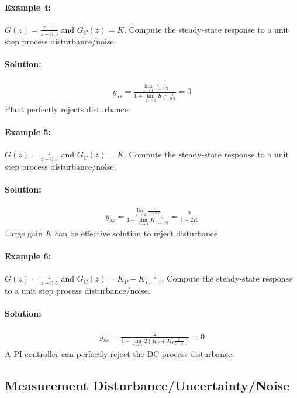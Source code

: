 \documentclass[twoside]{article}
\begin{document}
\paragraph{Example 4:} $G(z) = \frac{z-1}{z-0.5}$ and $G_C(z) =
K$. Compute the steady-state response to a unit step
process disturbance/noise.

\paragraph{Solution:} 
%
\begin{align*}
y_{ss} = \frac{\lim_{z\to1}  \frac{z-1}{z-0.5}}{1 + \lim_{z\to1} K
  \frac{z-1}{z-0.5}} = 0
\end{align*}
%
Plant perfectly rejects disturbance. 
%

\paragraph{Example 5:} $G(z) = \frac{z}{z-0.5}$ and $G_C(z) =
K$. Compute the steady-state response to a unit step
process disturbance/noise.

\paragraph{Solution:} 
%
\begin{align*}
y_{ss} = \frac{\lim_{z\to1}  \frac{z}{z-0.5}}{1 + \lim_{z\to1} K
  \frac{z}{z-0.5}} = \frac{2}{1 + 2 K} 
\end{align*}
%
Large gain $K$ can be effective solution to reject disturbance
%

\paragraph{Example 6:} $G(z) = \frac{z}{z-0.5}$ and $G_C(z) = K_P +
K_I \frac{z}{z-1}$. Compute the steady-state response to a unit step
process disturbance/noise.

\paragraph{Solution:} 
%
\begin{align*}
y_{ss} = \frac{2}{1 + \lim_{z\to1} 2 \left(K_P + K_I  \frac{z}{z-1} \right)} = 0
\end{align*}
%
A PI controller can perfectly reject the DC process
disturbance. 
%

\subsection*{Measurement Disturbance/Uncertainty/Noise}
\end{document}
